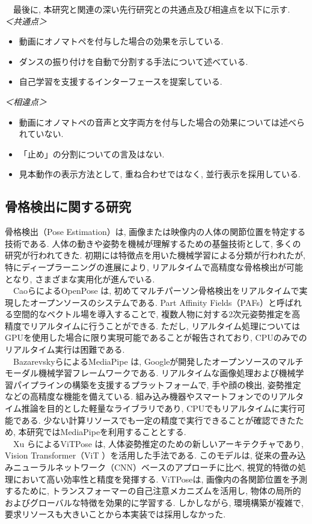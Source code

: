 \documentclass[paper]{ieicej}
\begin{document}
　最後に, 本研究と関連の深い先行研究との共通点及び相違点を以下に示す.\\
\textit{＜共通点＞}
\begin{itemize}[nosep]
  \item 動画にオノマトペを付与した場合の効果を示している. 
  \item ダンスの振り付けを自動で分割する手法について述べている. 
  \item 自己学習を支援するインターフェースを提案している. 
\end{itemize}
\textit{＜相違点＞}
\begin{itemize}[nosep]
  \item 動画にオノマトペの音声と文字両方を付与した場合の効果については述べられていない. 
  \item 「止め」の分割についての言及はない. 
  \item 見本動作の表示方法として, 重ね合わせではなく, 並行表示を採用している. 
\end{itemize}
\subsection{骨格検出に関する研究}
骨格検出（Pose Estimation）は, 画像または映像内の人体の関節位置を特定する技術である. 人体の動きや姿勢を機械が理解するための基盤技術として, 多くの研究が行われてきた. 初期には特徴点を用いた機械学習による分類が行われたが, 特にディープラーニングの進展により, リアルタイムで高精度な骨格検出が可能となり, さまざまな実用化が進んでいる. \\
　CaoらによるOpenPose \cite{ref23}は, 初めてマルチパーソン骨格検出をリアルタイムで実現したオープンソースのシステムである. Part Affinity Fields（PAFs）と呼ばれる空間的なベクトル場を導入することで, 複数人物に対する2次元姿勢推定を高精度でリアルタイムに行うことができる. ただし, リアルタイム処理についてはGPUを使用した場合に限り実現可能であることが報告されており, CPUのみでのリアルタイム実行は困難である.\\
　BazarevskyらによるMediaPipe \cite{ref24}は, Googleが開発したオープンソースのマルチモーダル機械学習フレームワークである. リアルタイムな画像処理および機械学習パイプラインの構築を支援するプラットフォームで, 手や顔の検出, 姿勢推定などの高精度な機能を備えている. 組み込み機器やスマートフォンでのリアルタイム推論を目的とした軽量なライブラリであり, CPUでもリアルタイムに実行可能である. 少ない計算リソースでも一定の精度で実行できることが確認できたため, 本研究ではMediaPipeを利用することとする.\\
　Xu らによるViTPose \cite{ref25}は, 人体姿勢推定のための新しいアーキテクチャであり, Vision Transformer（ViT \cite{ref26}）を活用した手法である. このモデルは, 従来の畳み込みニューラルネットワーク（CNN）ベースのアプローチに比べ, 視覚的特徴の処理において高い効率性と精度を発揮する. ViTPoseは, 画像内の各関節位置を予測するために, トランスフォーマーの自己注意メカニズムを活用し, 物体の局所的およびグローバルな特徴を効果的に学習する. しかしながら, 環境構築が複雑で, 要求リソースも大きいことから本実装では採用しなかった. 
\end{document}
